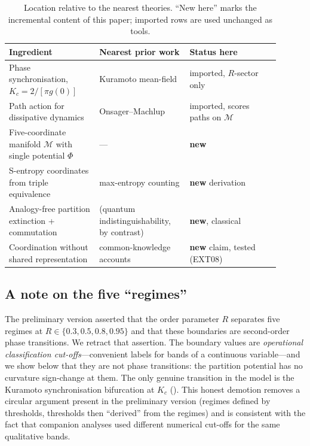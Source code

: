 \documentclass[11pt,twocolumn,a4paper]{article}
\newcommand{\M}{\mathcal{M}}
\newcommand{\Pot}{\Phi}
\newcommand{\Kc}{K_c}
\newcommand{\Ord}{R}
\begin{document}
\begin{table}[htbp]
\centering
\small
\caption{Location relative to the nearest theories. ``New here'' marks the
incremental content of this paper; imported rows are used unchanged as tools.}
\label{tab:relation}
\begin{tabular}{@{}p{0.30\linewidth}p{0.30\linewidth}p{0.30\linewidth}@{}}
\toprule
\textbf{Ingredient} & \textbf{Nearest prior work} & \textbf{Status here}\\
\midrule
Phase synchronisation, $\Kc=2/[\pi g(0)]$ & Kuramoto mean-field & imported,
$\Ord$-sector only\\
Path action for dissipative dynamics & Onsager--Machlup & imported, scores paths
on $\M$\\
Five-coordinate manifold $\M$ with single potential $\Pot$ & --- & \textbf{new}\\
S-entropy coordinates from triple equivalence & max-entropy counting & \textbf{new}
derivation\\
Analogy-free partition extinction + commutation & (quantum indistinguishability,
by contrast) & \textbf{new}, classical\\
Coordination without shared representation & common-knowledge accounts & \textbf{new}
claim, tested (EXT08)\\
\bottomrule
\end{tabular}
\end{table}

\subsection{A note on the five ``regimes''}

The preliminary version asserted that the order parameter $\Ord$ separates five
regimes at $\Ord\in\{0.3,0.5,0.8,0.95\}$ and that these boundaries are
second-order phase transitions. We retract that assertion. The boundary values
are \emph{operational classification cut-offs}---convenient labels for bands of
a continuous variable---and we show below that they are not phase transitions:
the partition potential has no curvature sign-change at them. The only genuine
transition in the model is the Kuramoto synchronisation bifurcation at $\Kc$
(). This honest demotion removes a circular argument present
in the preliminary version (regimes defined by thresholds, thresholds then
``derived'' from the regimes) and is consistent with the fact that companion
analyses used different numerical cut-offs for the same qualitative bands.
\end{document}

